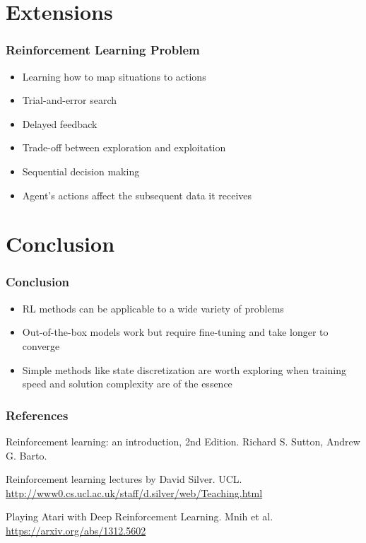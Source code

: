 \documentclass{beamer}
\begin{document}
\section{Extensions}

\begin{frame}
	\frametitle{Reinforcement Learning Problem}
	\begin{itemize}
		\item Learning how to map situations to actions 
		\item Trial-and-error search
		\item Delayed feedback
		\item Trade-off between exploration and exploitation
		\item Sequential decision making
		\item Agent's actions affect the subsequent data it receives
	\end{itemize}
\end{frame}






\section{Conclusion}

\begin{frame}
\frametitle{Conclusion}
\begin{itemize}
	\item RL methods can be applicable to
	a wide variety of problems
	
	\item Out-of-the-box models work but 
	require fine-tuning and take 
	longer to converge
	
	\item Simple methods like state discretization
	are worth exploring when training speed and
	solution complexity are of the essence 
	
\end{itemize}
\end{frame}


\begin{frame}
\frametitle{References}
\footnotesize{
\begin{thebibliography}{5} 
	
\label{rl_book}
Reinforcement learning: an introduction, 2nd Edition. 
Richard S. Sutton, Andrew G. Barto. 

\label{ucl_course}
Reinforcement learning lectures by David Silver. UCL.
\url{http://www0.cs.ucl.ac.uk/staff/d.silver/web/Teaching.html} 

\label{deepmind}
Playing Atari with Deep Reinforcement Learning. Mnih et al.
\url{https://arxiv.org/abs/1312.5602}


\end{thebibliography}
}
\end{frame}
\end{document}
